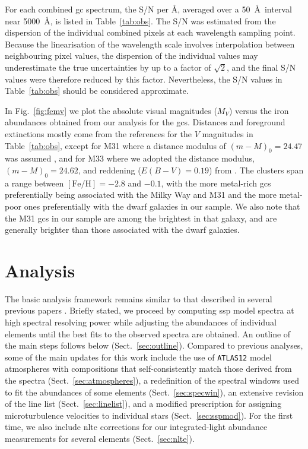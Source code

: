 \documentclass{aa}
\begin{document}
For each combined \ac{gc} spectrum, the S/N per \AA, averaged over a 50~\AA\ interval near 5000~\AA , is listed in Table~\ref{tab:obs}. The S/N was estimated from the dispersion of the individual combined pixels at each wavelength sampling point. Because the linearisation of the wavelength scale involves interpolation between neighbouring pixel values, the dispersion of the individual values may underestimate the true uncertainties by up to a factor of $\sqrt{2}$, and the final S/N values were therefore reduced by this factor. Nevertheless, the S/N values in Table~\ref{tab:obs} should be considered approximate.

In Fig.~\ref{fig:femv} we plot the absolute visual magnitudes ($M_V$) versus the iron abundances obtained from our analysis for the \acp{gc}. Distances and foreground extinctions mostly come from the references for the $V$ magnitudes in Table~\ref{tab:obs}, except for M31 where a distance modulus of $(m-M)_0=24.47$ was assumed \citep{Stanek1998}, and for M33 where we adopted the distance modulus, $(m-M)_0=24.62$, and reddening ($E(B-V)=0.19$) from \citet{Gieren2013}. 
The clusters span a range between $\mathrm{[Fe/H]}=-2.8$ and $-0.1$, with the more metal-rich \acp{gc} preferentially being associated with the Milky Way and M31 and the more metal-poor ones preferentially with the dwarf galaxies in our sample. We also note that the M31 \acp{gc} in our sample are among the brightest in that galaxy, and are generally brighter than those associated with the dwarf galaxies. 

\section{Analysis}

The basic analysis framework remains similar to that described in several previous papers \citep{Larsen2012a,Larsen2017,Larsen2018}. Briefly stated, we proceed by computing \ac{ssp} model spectra at high spectral resolving power while adjusting the abundances of individual elements until the best fits to the observed spectra are obtained. An outline of the main steps follows below (Sect.~\ref{sec:outline}). 
Compared to previous analyses, some of the main updates for this work include the use of \texttt{ATLAS12} model atmospheres with compositions that self-consistently match those derived from the spectra (Sect.~\ref{sec:atmospheres}), a redefinition of the spectral windows used to fit the abundances of some elements (Sect.~\ref{sec:specwin}), an extensive revision of the line list (Sect.~\ref{sec:linelist}), and a modified prescription for assigning microturbulence velocities to individual stars (Sect.~\ref{sec:sspmod}).
For the first time, we also include \ac{nlte} corrections for our integrated-light abundance measurements for several elements  (Sect.~\ref{sec:nlte}). 
\end{document}
